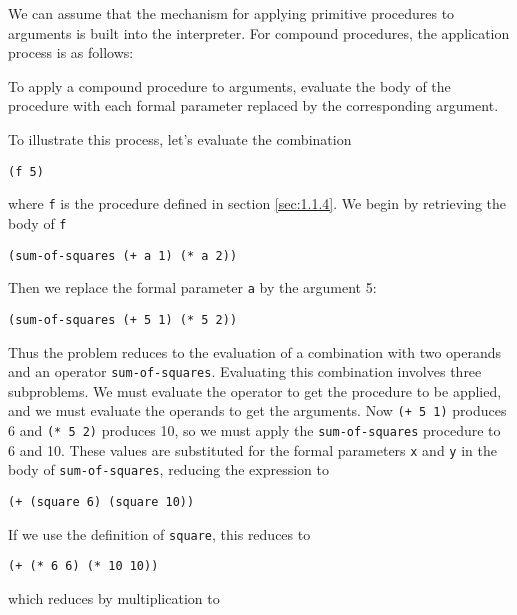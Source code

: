 We can assume that the mechanism for applying primitive procedures to
arguments is built into the interpreter.  For compound procedures, the
application process is as follows:

\begin{theorem}
To apply a compound procedure to arguments, evaluate the body of the
procedure with each formal parameter replaced by the corresponding
argument.
\end{theorem}

To illustrate this process, let's evaluate the combination

\begin{verbatim}
(f 5)
\end{verbatim}

where \texttt{f} is the procedure defined in
section \ref{sec:1.1.4}.  We begin by retrieving the
body of \texttt{f}

\begin{verbatim}
(sum-of-squares (+ a 1) (* a 2))
\end{verbatim}

Then we replace the formal parameter \texttt{a} by the argument 5:

\begin{verbatim}
(sum-of-squares (+ 5 1) (* 5 2))
\end{verbatim}

Thus the problem reduces to the evaluation of a combination with two
operands and an operator \texttt{sum-of-squares}.  Evaluating this
combination involves three subproblems.  We must evaluate the operator
to get the procedure to be applied, and we must evaluate the operands
to get the arguments.  Now \texttt{(+ 5 1)} produces 6 and \texttt{(*
  5 2)} produces 10, so we must apply the \texttt{sum-of-squares}
procedure to 6 and 10.  These values are substituted for the formal
parameters \texttt{x} and \texttt{y} in the body of
\texttt{sum-of-squares}, reducing the expression to

\begin{verbatim}
(+ (square 6) (square 10))
\end{verbatim}

If we use the definition of \texttt{square}, this reduces to

\begin{verbatim}
(+ (* 6 6) (* 10 10))
\end{verbatim}

which reduces by multiplication to


